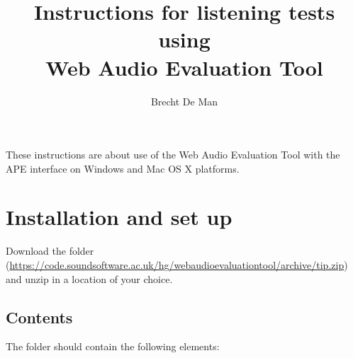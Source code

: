 \documentclass[11pt, oneside]{article}   	%
\title{Instructions for listening tests using\\ Web Audio Evaluation Tool}
\author{Brecht De Man}
\date{}							%
\begin{document}
\maketitle

These instructions are about use of the Web Audio Evaluation Tool \cite{waet} with the APE interface \cite{ape} on Windows and Mac OS X platforms. 

\tableofcontents

\clearpage

\section{Installation and set up}
	Download the folder (\url{https://code.soundsoftware.ac.uk/hg/webaudioevaluationtool/archive/tip.zip}) and unzip in a location of your choice. 
	
	\subsection{Contents}
		The folder should contain the following elements: \\
		
\end{document}
